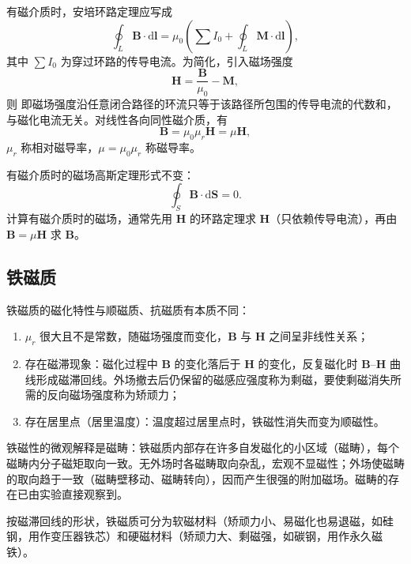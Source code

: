     有磁介质时，安培环路定理应写成
    \[
    \oint_L\boldsymbol{B}\cdot\mathrm{d}\boldsymbol{l}=\mu_0\left(\sum I_0+\oint_L\boldsymbol{M}\cdot\mathrm{d}\boldsymbol{l}\right),
    \]
    其中 $\sum I_0$ 为穿过环路的传导电流。为简化，引入磁场强度
    \[
    \boldsymbol{H}=\frac{\boldsymbol{B}}{\mu_0}-\boldsymbol{M},
    \]
    则
    即磁场强度沿任意闭合路径的环流只等于该路径所包围的传导电流的代数和，与磁化电流无关。对线性各向同性磁介质，有
    \[
    \boldsymbol{B}=\mu_0\mu_r\boldsymbol{H}=\mu\boldsymbol{H},
    \]
    $\mu_r$ 称相对磁导率，$\mu=\mu_0\mu_r$ 称磁导率。

    有磁介质时的磁场高斯定理形式不变：
    \[
    \oint_S\boldsymbol{B}\cdot\mathrm{d}\boldsymbol{S}=0.
    \]
    计算有磁介质时的磁场，通常先用 $\boldsymbol{H}$ 的环路定理求 $\boldsymbol{H}$（只依赖传导电流），再由 $\boldsymbol{B}=\mu\boldsymbol{H}$ 求 $\boldsymbol{B}$。

    \subsection{铁磁质}
    铁磁质的磁化特性与顺磁质、抗磁质有本质不同：
    \begin{enumerate}
        \item $\mu_r$ 很大且不是常数，随磁场强度而变化，$\boldsymbol{B}$ 与 $\boldsymbol{H}$ 之间呈非线性关系；
        \item 存在磁滞现象：磁化过程中 $\boldsymbol{B}$ 的变化落后于 $\boldsymbol{H}$ 的变化，反复磁化时 $\boldsymbol{B}$--$\boldsymbol{H}$ 曲线形成磁滞回线。外场撤去后仍保留的磁感应强度称为剩磁，要使剩磁消失所需的反向磁场强度称为矫顽力；
        \item 存在居里点（居里温度）：温度超过居里点时，铁磁性消失而变为顺磁性。
    \end{enumerate}
    铁磁性的微观解释是磁畴：铁磁质内部存在许多自发磁化的小区域（磁畴），每个磁畴内分子磁矩取向一致。无外场时各磁畴取向杂乱，宏观不显磁性；外场使磁畴的取向趋于一致（磁畴壁移动、磁畴转向），因而产生很强的附加磁场。磁畴的存在已由实验直接观察到。

    按磁滞回线的形状，铁磁质可分为软磁材料（矫顽力小、易磁化也易退磁，如硅钢，用作变压器铁芯）和硬磁材料（矫顽力大、剩磁强，如碳钢，用作永久磁铁）。

